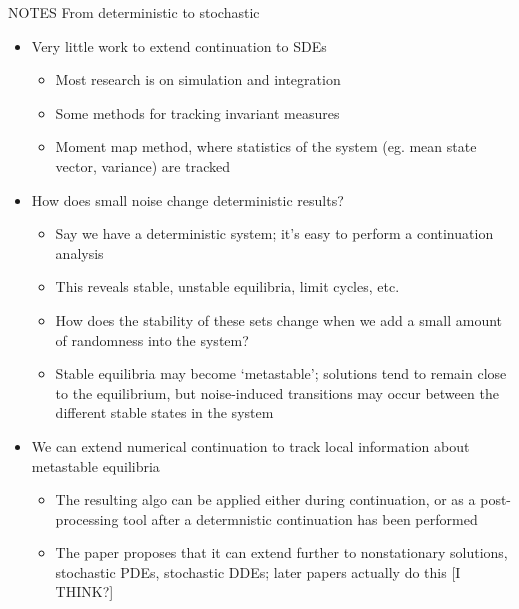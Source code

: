 \documentclass[presentation]{beamer}
\begin{document}
\begin{frame}[label={sec:org2ebac0e},plain]{NOTES From deterministic to stochastic}
\begin{itemize}
\item Very little work to extend continuation to SDEs
\begin{itemize}
\item Most research is on simulation and integration
\item Some methods for tracking invariant measures
\item Moment map method, where statistics of the system (eg. mean state vector, variance) are tracked
\end{itemize}
\end{itemize}
\vfill
\begin{itemize}
\item How does small noise change deterministic results?
\begin{itemize}
\item Say we have a deterministic system; it's easy to perform a continuation analysis
\item This reveals stable, unstable equilibria, limit cycles, etc.
\item How does the stability of these sets change when we add a small amount of randomness into the system?
\item Stable equilibria may become `metastable'; solutions tend to remain close to the equilibrium, but noise-induced transitions may occur between the different stable states in the system
\end{itemize}
\end{itemize}
\vfill
\begin{itemize}
\item We can extend numerical continuation to track local information about metastable equilibria
\begin{itemize}
\item The resulting algo can be applied either during continuation, or as a post-processing tool after a determnistic continuation has been performed
\item The paper proposes that it can extend further to nonstationary solutions, stochastic PDEs, stochastic DDEs; later papers actually do this [I THINK?]
\end{itemize}
\end{itemize}
\end{frame}
\end{document}
